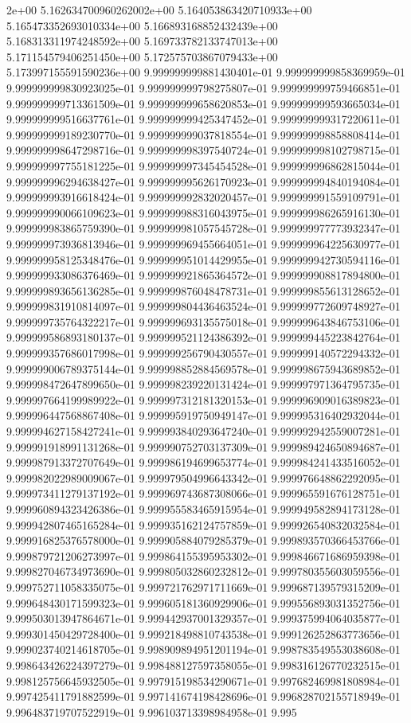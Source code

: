 2e+00	5.162634700960262002e+00	5.164053863420710933e+00	5.165473352693010334e+00	5.166893168852432439e+00	5.168313311974248592e+00	5.169733782133747013e+00	5.171154579406251450e+00	5.172575703867079433e+00	5.173997155591590236e+00
9.999999999881430401e-01	9.999999999858369959e-01	9.999999999830923025e-01	9.999999999798275807e-01	9.999999999759466851e-01	9.999999999713361509e-01	9.999999999658620853e-01	9.999999999593665034e-01	9.999999999516637761e-01	9.999999999425347452e-01	9.999999999317220611e-01	9.999999999189230770e-01	9.999999999037818554e-01	9.999999998858808414e-01	9.999999998647298716e-01	9.999999998397540724e-01	9.999999998102798715e-01	9.999999997755181225e-01	9.999999997345454528e-01	9.999999996862815044e-01	9.999999996294638427e-01	9.999999995626170923e-01	9.999999994840194084e-01	9.999999993916618424e-01	9.999999992832020457e-01	9.999999991559109791e-01	9.999999990066109623e-01	9.999999988316043975e-01	9.999999986265916130e-01	9.999999983865759390e-01	9.999999981057545728e-01	9.999999977773932347e-01	9.999999973936813946e-01	9.999999969455664051e-01	9.999999964225630977e-01	9.999999958125348476e-01	9.999999951014429955e-01	9.999999942730594116e-01	9.999999933086376469e-01	9.999999921865364572e-01	9.999999908817894800e-01	9.999999893656136285e-01	9.999999876048478731e-01	9.999999855613128652e-01	9.999999831910814097e-01	9.999999804436463524e-01	9.999999772609748927e-01	9.999999735764322217e-01	9.999999693135575018e-01	9.999999643846753106e-01	9.999999586893180137e-01	9.999999521124386392e-01	9.999999445223842764e-01	9.999999357686017998e-01	9.999999256790430557e-01	9.999999140572294332e-01	9.999999006789375144e-01	9.999998852884569578e-01	9.999998675943689852e-01	9.999998472647899650e-01	9.999998239220131424e-01	9.999997971364795735e-01	9.999997664199989922e-01	9.999997312181320153e-01	9.999996909016389823e-01	9.999996447568867408e-01	9.999995919750949147e-01	9.999995316402932044e-01	9.999994627158427241e-01	9.999993840293647240e-01	9.999992942559007281e-01	9.999991918991131268e-01	9.999990752703137309e-01	9.999989424650894687e-01	9.999987913372707649e-01	9.999986194699653774e-01	9.999984241433516052e-01	9.999982022989009067e-01	9.999979504996643342e-01	9.999976648862292095e-01	9.999973411279137192e-01	9.999969743687308066e-01	9.999965591676128751e-01	9.999960894323426386e-01	9.999955583465915954e-01	9.999949582894173128e-01	9.999942807465165284e-01	9.999935162124757859e-01	9.999926540832032584e-01	9.999916825376578000e-01	9.999905884079285379e-01	9.999893570366453766e-01	9.999879721206273997e-01	9.999864155395953302e-01	9.999846671686959398e-01	9.999827046734973690e-01	9.999805032860232812e-01	9.999780355603059556e-01	9.999752711058335075e-01	9.999721762971711669e-01	9.999687139579315209e-01	9.999648430171599323e-01	9.999605181360929906e-01	9.999556893031352756e-01	9.999503013947864671e-01	9.999442937001329357e-01	9.999375994064035877e-01	9.999301450429728400e-01	9.999218498810743538e-01	9.999126252863773656e-01	9.999023740214618705e-01	9.998909894951201194e-01	9.998783549553038608e-01	9.998643426224397279e-01	9.998488127597358055e-01	9.998316126770232515e-01	9.998125756645932505e-01	9.997915198534290671e-01	9.997682469981808984e-01	9.997425411791882599e-01	9.997141674198428696e-01	9.996828702155718949e-01	9.996483719707522919e-01	9.996103713398984958e-01	9.995